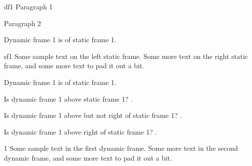 \documentclass{article}
\begin{document}

\begin{dynamiccontents*}{df1}
Paragraph 1

Paragraph 2
\end{dynamiccontents*}

Dynamic frame 1 is 
of static frame 1.

\newpage\mbox{}

\begin{staticcontents*}{sf1}
Some sample text on the left static frame.
Some more text on the right static frame, and
some more text to pad it out a bit.
\end{staticcontents*}

\newpage\mbox{}

Dynamic frame 1 is
of static frame 1.

Is dynamic frame 1 above static frame 1?
.

Is dynamic frame 1 above but not right of static frame 1?
.

Is dynamic frame 1 above right of static frame 1?
.

\begin{dynamiccontents}{1}
Some sample text in the first dynamic frame.
Some more text in the second dynamic frame, and
some more text to pad it out a bit.
\end{dynamiccontents}
\end{document}
